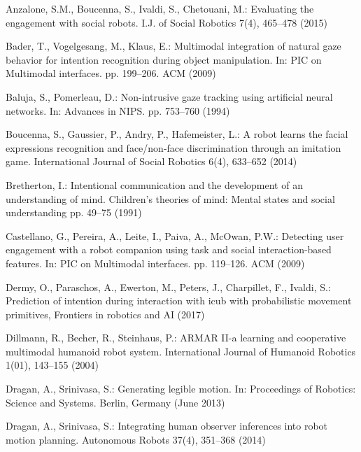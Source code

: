 \documentclass[runningheads,a4paper]{llncs}
\begin{document}
\begin{thebibliography}{4}
\providecommand{\url}[1]{\texttt{#1}}
\providecommand{\urlprefix}{URL }

Anzalone, S.M., Boucenna, S., Ivaldi, S., Chetouani, M.: Evaluating the
  engagement with social robots. I.J. of Social Robotics
  7(4),  465--478 (2015)

Bader, T., Vogelgesang, M., Klaus, E.: Multimodal integration of natural gaze
  behavior for intention recognition during object manipulation. In:
  PIC on Multimodal interfaces.
  pp. 199--206. ACM (2009)

Baluja, S., Pomerleau, D.: Non-intrusive gaze tracking using artificial neural
  networks. In: Advances in NIPS. pp. 753--760
  (1994)

Boucenna, S., Gaussier, P., Andry, P., Hafemeister, L.: A robot learns the
  facial expressions recognition and face/non-face discrimination through an
  imitation game. International Journal of Social Robotics  6(4),  633--652
  (2014)

Bretherton, I.: Intentional communication and the development of an
  understanding of mind. Children's theories of mind: Mental states and social
  understanding pp. 49--75 (1991)

Castellano, G., Pereira, A., Leite, I., Paiva, A., McOwan, P.W.: Detecting user
  engagement with a robot companion using task and social interaction-based
  features. In: PIC on Multimodal
  interfaces. pp. 119--126. ACM (2009)

Dermy, O., Paraschos, A., Ewerton, M., Peters, J., Charpillet, F., Ivaldi, S.:
  Prediction of intention during interaction with icub with probabilistic
  movement primitives, Frontiers in robotics and AI (2017)

Dillmann, R., Becher, R., Steinhaus, P.: {ARMAR} II-a learning and cooperative
  multimodal humanoid robot system. International Journal of Humanoid Robotics
  1(01),  143--155 (2004)

Dragan, A., Srinivasa, S.: Generating legible motion. In: Proceedings of
  Robotics: Science and Systems. Berlin, Germany (June 2013)

Dragan, A., Srinivasa, S.: Integrating human observer inferences into robot
  motion planning. Autonomous Robots  37(4),  351--368 (2014)


\end{thebibliography}
\end{document}
